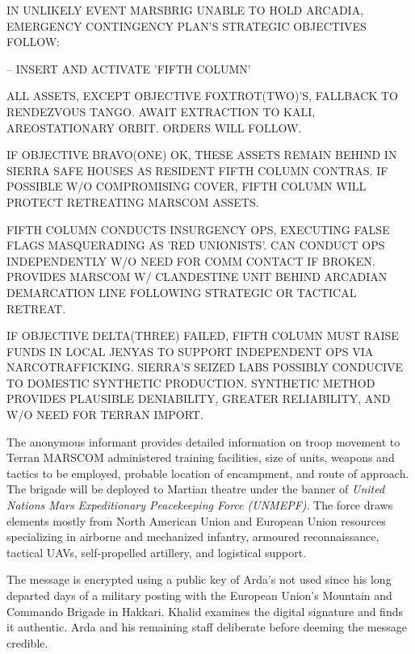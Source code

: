 IN UNLIKELY EVENT MARSBRIG UNABLE TO HOLD ARCADIA, EMERGENCY CONTINGENCY PLAN'S STRATEGIC OBJECTIVES FOLLOW:
\startitemize[4]
\item {} -- INSERT AND ACTIVATE 'FIFTH COLUMN'

    \startitemize[n]
    \item ALL ASSETS, EXCEPT OBJECTIVE FOXTROT(TWO)'S, FALLBACK TO RENDEZVOUS TANGO. AWAIT EXTRACTION TO KALI, AREOSTATIONARY ORBIT. ORDERS WILL FOLLOW.

    \item IF OBJECTIVE BRAVO(ONE) OK, THESE ASSETS REMAIN BEHIND IN SIERRA SAFE HOUSES AS RESIDENT FIFTH COLUMN CONTRAS. IF POSSIBLE W/O COMPROMISING COVER, FIFTH COLUMN WILL PROTECT RETREATING MARSCOM ASSETS.

    \item FIFTH COLUMN CONDUCTS INSURGENCY OPS, EXECUTING FALSE FLAGS MASQUERADING AS 'RED UNIONISTS'. CAN CONDUCT OPS INDEPENDENTLY W/O NEED FOR COMM CONTACT IF BROKEN. PROVIDES MARSCOM W/ CLANDESTINE UNIT BEHIND ARCADIAN DEMARCATION LINE FOLLOWING STRATEGIC OR TACTICAL RETREAT.

    \item IF OBJECTIVE DELTA(THREE) FAILED, FIFTH COLUMN MUST RAISE FUNDS IN LOCAL JENYAS TO SUPPORT INDEPENDENT OPS VIA NARCOTRAFFICKING. SIERRA'S SEIZED LABS POSSIBLY CONDUCIVE TO DOMESTIC SYNTHETIC PRODUCTION. SYNTHETIC METHOD PROVIDES PLAUSIBLE DENIABILITY, GREATER RELIABILITY, AND W/O NEED FOR TERRAN IMPORT.
    \stopitemize
\stopitemize
\stopTimelineCorrespondenceDocument

The anonymous informant provides detailed information on troop movement to Terran MARSCOM administered training facilities, size of units, weapons and tactics to be employed, probable location of encampment, and route of approach. The brigade will be deployed to Martian theatre under the banner of {\it United Nations Mars Expeditionary Peacekeeping Force (UNMEPF)}. The force draws elements mostly from North American Union and European Union resources specializing in airborne and mechanized infantry, armoured reconnaissance, tactical UAVs, self-propelled artillery, and logistical support.

The message is encrypted using a public key of Arda's not used since his long departed days of a military posting with the European Union's Mountain and Commando Brigade in Hakkari. Khalid examines the digital signature and finds it authentic. Arda and his remaining staff deliberate before deeming the message credible.
\StopTimelineDate

